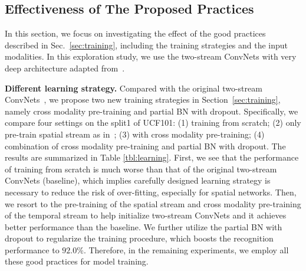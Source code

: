 \documentclass[10pt,journal,compsoc]{IEEEtran}
\begin{document}
\subsection{Effectiveness of The Proposed Practices}

In this section, we focus on investigating the effect of the good practices described in Sec.~\ref{sec:training}, including the training strategies and the input modalities. In this exploration study, we use the two-stream ConvNets with very deep architecture adapted from~\cite{IoffeS15}.

{\bf Different learning strategy.} Compared with the original two-stream ConvNets~\cite{SimonyanZ14}, we propose two new training strategies in Section~\ref{sec:training}, namely cross modality pre-training and partial BN with dropout. Specifically, we compare four settings on the split1 of UCF101: (1) training from scratch; (2) only pre-train spatial stream as in~\cite{SimonyanZ14}; (3) with cross modality pre-training; (4) combination of cross modality pre-training and partial BN with dropout. The results are summarized in Table \ref{tbl:learning}. First, we see that the performance of training from scratch is much worse than that of the original two-stream ConvNets (baseline), which implies carefully designed learning strategy is necessary to reduce the risk of over-fitting, especially for spatial networks. Then, we resort to the pre-training of the spatial stream and cross modality pre-training of the temporal stream to help initialize two-stream ConvNets and it achieves better performance than the baseline. We further utilize the partial BN with dropout to regularize the training procedure, which boosts the recognition performance to $92.0\%$. Therefore, in the remaining experiments, we employ all these good practices for model training.
\end{document}
